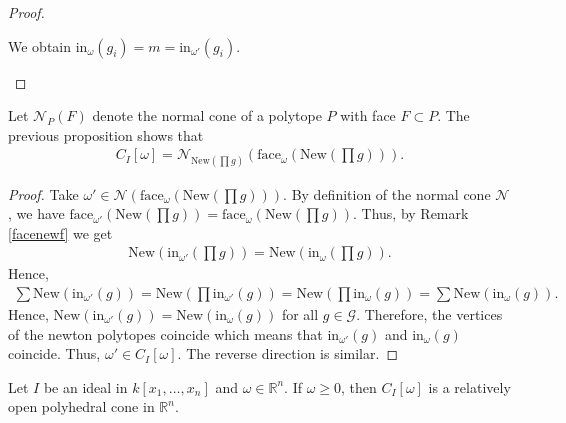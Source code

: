 \documentclass[a4paper, 11pt]{article}
\begin{document}
\begin{proof}
\begin{itemize}
    We obtain \( \mathrm{in}_\omega(g_i) = m = \mathrm{in}_{\omega'}(g_i) \).
  \end{itemize}
\end{proof}

\begin{cor}\label{ci-geometric}
  Let \( \mathcal{N}_P(F) \) denote the normal cone of a polytope \( P \) with face \( F \subset P \). The previous proposition shows that 
  \begin{align*}
    C_I[\omega] = \mathrm{\mathcal{N}}_{\mathrm{New}(\prod g)}(\mathrm{face}_\omega(\mathrm{New}(\prod g))).
  \end{align*}

\begin{proof}
  Take \( \omega' \in \mathrm{\mathcal{N}}(\mathrm{face}_\omega(\mathrm{New}(\prod g))) \). By definition of the normal cone \( \mathcal{N} \), we have \( \mathrm{face}_{\omega'}(\mathrm{New}(\prod g)) = \mathrm{face}_\omega(\mathrm{New}(\prod g)) \). Thus, by Remark \ref{facenewf} we get 
  \begin{align*}
    \mathrm{New}( \mathrm{in}_{\omega'}(\prod g)) =    \mathrm{New}( \mathrm{in}_\omega(\prod g)). 
  \end{align*}
  Hence, 
  \begin{align*}
    \sum \mathrm{New}(\mathrm{in}_{\omega'}(g)) = \mathrm{New}(\prod \mathrm{in}_{\omega'}( g)) =    \mathrm{New}(\prod  \mathrm{in}_\omega( g)) =  \sum \mathrm{New}(\mathrm{in}_{\omega}(g)). 
  \end{align*}
  Hence, \( \mathrm{New}(\mathrm{in}_{\omega'}(g)) = \mathrm{New} (\mathrm{in}_{\omega}(g)) \) for all \( g \in \mathcal{G} \). Therefore, the vertices of the newton polytopes coincide which means that \( \mathrm{in}_{\omega'}(g) \) and \( \mathrm{in}_{\omega}(g) \) coincide. Thus, \( \omega' \in C_I[\omega] \). The reverse direction is similar.
\end{proof}
\end{cor}

\begin{mdframed}
\begin{cor}
  Let \( I \) be an ideal in \( k[x_1, \dots, x_n] \) and \( \omega \in \mathbb R^n \). If \( \omega \geq 0 \), then \( C_I[\omega] \) is a relatively open polyhedral cone in \( \mathbb R^n \).
\end{cor}
\end{mdframed}
\end{document}
